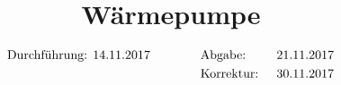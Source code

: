 

\subject{v206}
\title{Wärmepumpe}
\date{%
\begin{align}
& \text{Durchführung: 14.11.2017} & \hspace{3em} & \text{Abgabe: } & {21.11.2017}\notag \\
& & &\text{Korrektur: } & \text{30.11.2017} \notag
\end{align}
}



\maketitle
\thispagestyle{empty}
\tableofcontents
\newpage






\nocite{*}
\printbibliography{}



